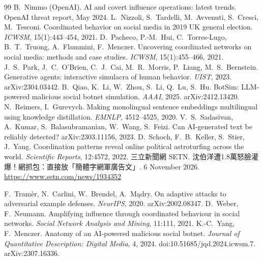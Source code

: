 \documentclass[10pt]{article}
\begin{document}
\begin{thebibliography}{99}
 B.~Nimmo (OpenAI). AI and covert influence operations: latest trends. OpenAI threat report, May 2024.
 L.~Nizzoli, S.~Tardelli, M.~Avvenuti, S.~Cresci, M.~Tesconi. Coordinated behavior on social media in 2019 UK general election. \emph{ICWSM}, 15(1):443--454, 2021.
 D.~Pacheco, P.-M.~Hui, C.~Torres-Lugo, B.~T.~Truong, A.~Flammini, F.~Menczer. Uncovering coordinated networks on social media: methods and case studies. \emph{ICWSM}, 15(1):455--466, 2021.
 J.~S.~Park, J.~C.~O'Brien, C.~J.~Cai, M.~R.~Morris, P.~Liang, M.~S.~Bernstein. Generative agents: interactive simulacra of human behavior. \emph{UIST}, 2023. arXiv:2304.03442.
 B.~Qiao, K.~Li, W.~Zhou, S.~Li, Q.~Lu, S.~Hu. BotSim: LLM-powered malicious social botnet simulation. \emph{AAAI}, 2025. arXiv:2412.13420.
 N.~Reimers, I.~Gurevych. Making monolingual sentence embeddings multilingual using knowledge distillation. \emph{EMNLP}, 4512--4525, 2020.
 V.~S.~Sadasivan, A.~Kumar, S.~Balasubramanian, W.~Wang, S.~Feizi. Can AI-generated text be reliably detected? arXiv:2303.11156, 2023.
 D.~Schoch, F.~B.~Keller, S.~Stier, J.~Yang. Coordination patterns reveal online political astroturfing across the world. \emph{Scientific Reports}, 12:4572, 2022.
三立新聞網 SETN. 沈伯洋遭1.8萬怒臉灌爆！網抓包：直接放「簡體字網軍廣告文」. 6 November 2026. \url{https://www.setn.com/news/1934352}

 F.~Tram\`er, N.~Carlini, W.~Brendel, A.~M\k{a}dry. On adaptive attacks to adversarial example defenses. \emph{NeurIPS}, 2020. arXiv:2002.08347.
 D.~Weber, F.~Neumann. Amplifying influence through coordinated behaviour in social networks. \emph{Social Network Analysis and Mining}, 11:111, 2021.
 K.-C.~Yang, F.~Menczer. Anatomy of an AI-powered malicious social botnet. \emph{Journal of Quantitative Description: Digital Media}, 4, 2024. doi:10.51685/jqd.2024.icwsm.7. arXiv:2307.16336.
\end{thebibliography}

\appendix
\end{document}

